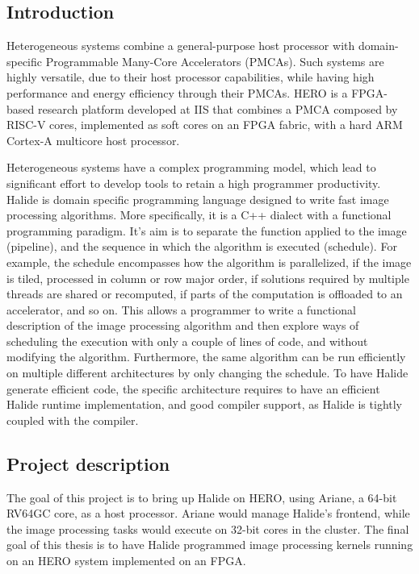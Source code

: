 \hypertarget{introduction}{%
\subsection{Introduction}\label{introduction}}

Heterogeneous systems combine a general-purpose host processor with
domain-specific Programmable Many-Core Accelerators (PMCAs). Such
systems are highly versatile, due to their host processor capabilities,
while having high performance and energy efficiency through their PMCAs.
HERO is a FPGA-based research platform developed at IIS that combines a
PMCA composed by RISC-V cores, implemented as soft cores on an FPGA
fabric, with a hard ARM Cortex-A multicore host processor.

Heterogeneous systems have a complex programming model, which lead to
significant effort to develop tools to retain a high programmer
productivity. Halide is domain specific programming language designed to
write fast image processing algorithms. More specifically, it is a C++
dialect with a functional programming paradigm. It's aim is to separate
the function applied to the image (pipeline), and the sequence in which
the algorithm is executed (schedule). For example, the schedule
encompasses how the algorithm is parallelized, if the image is tiled,
processed in column or row major order, if solutions required by
multiple threads are shared or recomputed, if parts of the computation
is offloaded to an accelerator, and so on. This allows a programmer to
write a functional description of the image processing algorithm and
then explore ways of scheduling the execution with only a couple of
lines of code, and without modifying the algorithm. Furthermore, the
same algorithm can be run efficiently on multiple different
architectures by only changing the schedule. To have Halide generate
efficient code, the specific architecture requires to have an efficient
Halide runtime implementation, and good compiler support, as Halide is
tightly coupled with the compiler.

\hypertarget{project_description}{%
\subsection{Project description}\label{project_description}}

The goal of this project is to bring up Halide on HERO, using Ariane, a
64-bit RV64GC core, as a host processor. Ariane would manage Halide's
frontend, while the image processing tasks would execute on 32-bit cores
in the cluster. The final goal of this thesis is to have Halide
programmed image processing kernels running on an HERO system
implemented on an FPGA.

